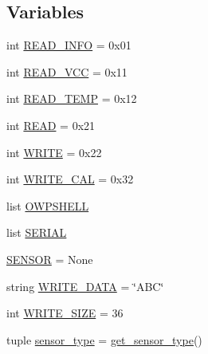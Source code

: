\subsection*{Variables}
\begin{DoxyCompactItemize}
\item 
int \hyperlink{namespacetest_ae3d92ee5a9adc4f30b4dbe11ddb40a21}{R\-E\-A\-D\-\_\-\-I\-N\-F\-O} = 0x01
\item 
int \hyperlink{namespacetest_a44e5ad39f0c147a2e71624be56e99d95}{R\-E\-A\-D\-\_\-\-V\-C\-C} = 0x11
\item 
int \hyperlink{namespacetest_a79f4ea0acd6b49713be24560c2a71f6a}{R\-E\-A\-D\-\_\-\-T\-E\-M\-P} = 0x12
\item 
int \hyperlink{namespacetest_a2ce8a5c40c782312e4064330f10e3703}{R\-E\-A\-D} = 0x21
\item 
int \hyperlink{namespacetest_ac2d4de6ac2d32927ec95407a12368ea4}{W\-R\-I\-T\-E} = 0x22
\item 
int \hyperlink{namespacetest_ad426fa2987715f1e3e91b16989000b52}{W\-R\-I\-T\-E\-\_\-\-C\-A\-L} = 0x32
\item 
list \hyperlink{namespacetest_a16be3b8e62d4cb17a1b5bd413ea7a7cb}{O\-W\-P\-S\-H\-E\-L\-L}
\item 
list \hyperlink{namespacetest_a7c0b7ecb3e3b010c842bfe515e7a10b4}{S\-E\-R\-I\-A\-L}
\item 
\hyperlink{namespacetest_a2391ebb4e984e0aa09635f75c5d04c0c}{S\-E\-N\-S\-O\-R} = None
\item 
string \hyperlink{namespacetest_a8f2c78b1eb0ea3d8311cb713bed20e23}{W\-R\-I\-T\-E\-\_\-\-D\-A\-T\-A} = \char`\"{}A\-B\-C\char`\"{}
\item 
int \hyperlink{namespacetest_a6add39dbd057796c95a558ef27df7f91}{W\-R\-I\-T\-E\-\_\-\-S\-I\-Z\-E} = 36
\item 
tuple \hyperlink{namespacetest_a91abf77ee3cdf450b2ff3282338cadff}{sensor\-\_\-type} = \hyperlink{namespacetest_a723a5231a237d79a789f4ad357e7d6e0}{get\-\_\-sensor\-\_\-type}()
\end{DoxyCompactItemize}


